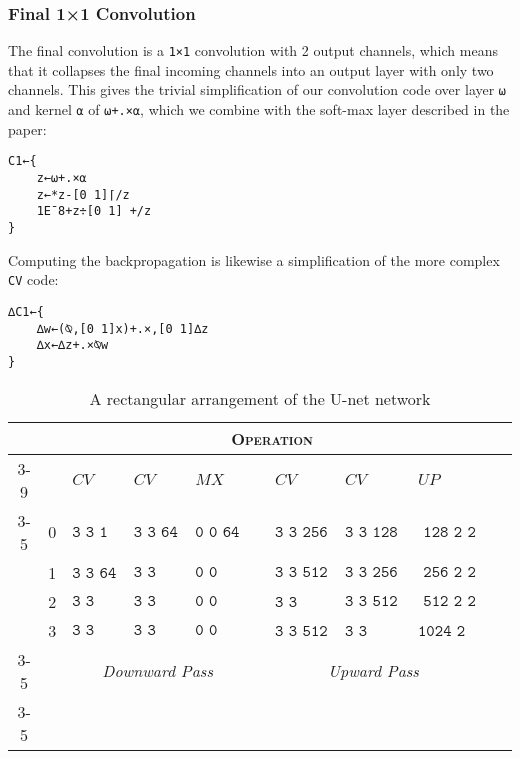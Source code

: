 \documentclass[10pt,twocolumn,english,format=sigplan,screen,balance]{acmart}
\newcommand{\noun}[1]{\textsc{#1}}
\providecommand{\tabularnewline}{\\}
\begin{document}
\subsubsection{Final 1×1 Convolution}

The final convolution is a \texttt{1×1} convolution with 2 output
channels, which means that it collapses the final incoming channels
into an output layer with only two channels. This gives the trivial
simplification of our convolution code over layer \texttt{⍵} and kernel
\texttt{⍺} of \texttt{⍵+.×⍺}, which we combine with the soft-max layer
described in the paper:
\begin{verbatim}
C1←{
    z←⍵+.×⍺
    z←*z-[0 1]⌈/z
    1E¯8+z÷[0 1] +/z
}
\end{verbatim}
Computing the backpropagation is likewise a simplification of the
more complex \texttt{CV} code:
\begin{verbatim}
∆C1←{
    ∆w←(⍉,[0 1]x)+.×,[0 1]∆z
    ∆x←∆z+.×⍉w
}
\end{verbatim}
\begin{table*}
\caption{A rectangular arrangement of the U-net network\label{tab:A-rectangular-arrangement}}

\begin{tabular}{crrrlrrrlrr}
 &
 &
\multicolumn{7}{c}{\noun{Operation}} &
 &
\tabularnewline
\cmidrule{3-9} \cmidrule{4-9} \cmidrule{5-9} \cmidrule{6-9} \cmidrule{7-9} \cmidrule{8-9} \cmidrule{9-9} 
 &
 &
\multicolumn{1}{l}{$CV$} &
\multicolumn{1}{l}{$CV$} &
$MX$ &
 &
\multicolumn{1}{l}{$CV$} &
\multicolumn{1}{l}{$CV$} &
$UP$ &
 &
\tabularnewline
\cmidrule{3-5} \cmidrule{4-5} \cmidrule{5-5} \cmidrule{7-9} \cmidrule{8-9} \cmidrule{9-9} 
\multirow{4}{*}{\begin{turn}{90}
\noun{Depth}
\end{turn}} &
{\tiny{}0} &
\texttt{\tiny{}$\texttt{3\ 3\ \ \ 1\ \ 64}$} &
{\tiny{}$\texttt{3 3 \ 64 \ 64}$} &
{\tiny{}$\texttt{0 0 \ 64 \ 64}$} &
 &
{\tiny{}$\texttt{3 3 \ 256 \ 128}$} &
{\tiny{}$\texttt{3 3 \ 128 \ 128}$} &
{\tiny{}$\texttt{\ 128 2 2 \ 64}$} &
 &
\tabularnewline
 & {\tiny{}1} &
\multirow{1}{*}{{\tiny{}$\texttt{3\ 3\ \ 64\ 128}$}} &
{\tiny{}$\texttt{3 3 128 128}$} &
{\tiny{}$\texttt{0 0 128 128}$} &
 &
{\tiny{}$\texttt{3 3 \ 512 \ 256}$} &
{\tiny{}$\texttt{3 3 \ 256 \ 256}$} &
{\tiny{}$\texttt{\ 256 2 2 128}$} &
 &
\tabularnewline
 & {\tiny{}2} &
{\tiny{}$\texttt{3 3 128 256}$} &
{\tiny{}$\texttt{3 3 256 256}$} &
{\tiny{}$\texttt{0 0 256 256}$} &
 &
{\tiny{}$\texttt{3 3 1024 \ 512}$} &
{\tiny{}$\texttt{3 3 \ 512 \ 512}$} &
{\tiny{}$\texttt{\ 512 2 2 256}$} &
 &
\tabularnewline
 & {\tiny{}3} &
{\tiny{}$\texttt{3 3 256 512}$} &
{\tiny{}$\texttt{3 3 512 512}$} &
{\tiny{}$\texttt{0 0 512 512}$} &
 &
{\tiny{}$\texttt{3 3 \ 512 1024}$} &
{\tiny{}$\texttt{3 3 1024 1024}$} &
{\tiny{}$\texttt{1024 2 2 512}$} &
 &
\tabularnewline
\cmidrule{3-5} \cmidrule{4-5} \cmidrule{5-5} \cmidrule{7-9} \cmidrule{8-9} \cmidrule{9-9} 
 &
 &
\multicolumn{3}{c}{\emph{Downward Pass}} &
 &
\multicolumn{3}{c}{\emph{Upward Pass}} &
 &
\tabularnewline
\cmidrule{3-5} \cmidrule{4-5} \cmidrule{5-5} \cmidrule{7-9} \cmidrule{8-9} \cmidrule{9-9} 
\end{tabular}
\end{table*}
\end{document}
